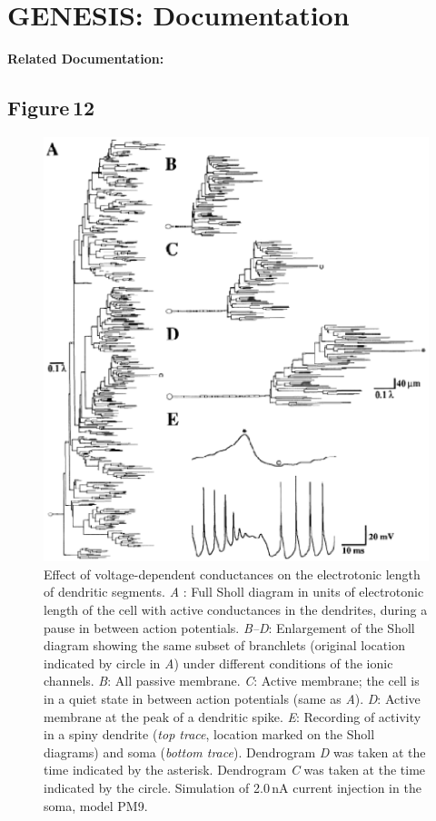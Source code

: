 \documentclass[12pt]{article}
\begin{document}
\section*{GENESIS: Documentation}

{\bf Related Documentation:}

\subsection*{Figure\,12}

\begin{figure}[h]
\centering
   \includegraphics[scale=0.75]{figures/Fig.1.12.eps}
   \caption{Effect of voltage-dependent conductances on the electrotonic length of dendritic segments. {\it A} : Full Sholl diagram in units of electrotonic length of the cell with active conductances in the dendrites, during a pause in between action potentials. {\it B--D}: Enlargement of the Sholl diagram showing the same subset of branchlets (original location indicated by circle in {\it A}) under different conditions of the ionic channels. {\it B}: All passive membrane. {\it C}: Active membrane; the cell is in a quiet state in between action potentials (same as {\it A}). {\it D}: Active membrane at the peak of a dendritic spike. {\it E}: Recording of activity in a spiny dendrite ({\em top trace}, location marked on the Sholl diagrams) and soma ({\em bottom trace}). Dendrogram {\it D} was taken at the time indicated by the asterisk. Dendrogram {\it C} was taken at the time indicated by the circle. Simulation of 2.0\,nA current injection in the soma, model PM9.}
   \label{fig:DS1.12}
\end{figure}



\end{document}
